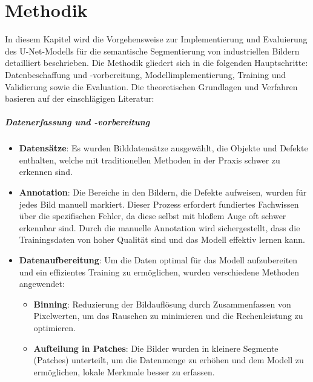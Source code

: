 \chapter{Methodik}\label{sec:exp_methodik}
In diesem Kapitel wird die Vorgehensweise zur Implementierung und Evaluierung des U-Net-Modells für die semantische Segmentierung von industriellen Bildern detailliert beschrieben. Die Methodik gliedert sich in die folgenden Hauptschritte: Datenbeschaffung und -vorbereitung, Modellimplementierung, Training und Validierung sowie die Evaluation. Die theoretischen Grundlagen und Verfahren basieren auf der einschlägigen Literatur: \cite{khaledyan_enhancing_2023, ketkar_deep_2021, noauthor_torchvision_nodate}

\paragraph{Datenerfassung und -vorbereitung}    

\begin{itemize} 

\item \textbf{Datensätze}: Es wurden Bilddatensätze ausgewählt, die Objekte und Defekte enthalten, welche mit traditionellen Methoden in der Praxis schwer zu erkennen sind.

\item \textbf{Annotation}: Die Bereiche in den Bildern, die Defekte aufweisen, wurden für jedes Bild manuell markiert. Dieser Prozess erfordert fundiertes Fachwissen über die spezifischen Fehler, da diese selbst mit bloßem Auge oft schwer erkennbar sind. Durch die manuelle Annotation wird sichergestellt, dass die Trainingsdaten von hoher Qualität sind und das Modell effektiv lernen kann.

\item \textbf{Datenaufbereitung}: Um die Daten optimal für das Modell aufzubereiten und ein effizientes Training zu ermöglichen, wurden verschiedene Methoden angewendet:
    \begin{itemize}
        \item \textbf{Binning}: Reduzierung der Bildauflösung durch Zusammenfassen von Pixelwerten, um das Rauschen zu minimieren und die Rechenleistung zu optimieren.
        \item \textbf{Aufteilung in Patches}: Die Bilder wurden in kleinere Segmente (Patches) unterteilt, um die Datenmenge zu erhöhen und dem Modell zu ermöglichen, lokale Merkmale besser zu erfassen.
    \end{itemize}
        
\end{itemize}
    
